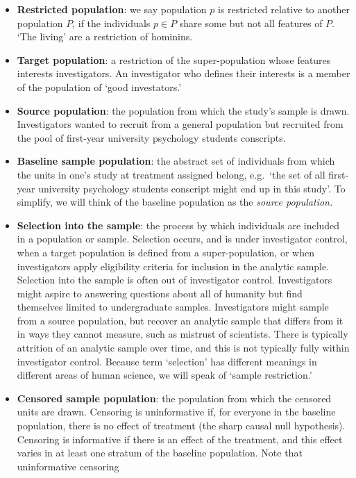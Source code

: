 \documentclass[
  single column]{article}
\begin{document}
\begin{itemize}
\item
  \textbf{Restricted population}: we say population \(p\) is restricted
  relative to another population \(P\), if the individuals \(p\in P\)
  share some but not all features of \(P\). `The living' are a
  restriction of hominins.
\item
  \textbf{Target population}: a restriction of the super-population
  whose features interests investigators. An investigator who defines
  their interests is a member of the population of `good investators.'
\item
  \textbf{Source population}: the population from which the study's
  sample is drawn. Investigators wanted to recruit from a general
  population but recruited from the pool of first-year university
  psychology students conscripts.
\item
  \textbf{Baseline sample population}: the abstract set of individuals
  from which the units in one's study at treatment assigned belong,
  e.g.~`the set of all first-year university psychology students
  conscript might end up in this study'. To simplify, we will think of
  the baseline population as the \emph{source population.}
\item
  \textbf{Selection into the sample}: the process by which individuals
  are included in a population or sample. Selection occurs, and is under
  investigator control, when a target population is defined from a
  super-population, or when investigators apply eligibility criteria for
  inclusion in the analytic sample. Selection into the sample is often
  out of investigator control. Investigators might aspire to answering
  questions about all of humanity but find themselves limited to
  undergraduate samples. Investigators might sample from a source
  population, but recover an analytic sample that differs from it in
  ways they cannot measure, such as mistrust of scientists. There is
  typically attrition of an analytic sample over time, and this is not
  typically fully within investigator control. Because term `selection'
  has different meanings in different areas of human science, we will
  speak of `sample restriction.'
\item
  \textbf{Censored sample population}: the population from which the
  censored units are drawn. Censoring is uninformative if, for everyone
  in the baseline population, there is no effect of treatment (the sharp
  causal null hypothesis). Censoring is informative if there is an
  effect of the treatment, and this effect varies in at least one
  stratum of the baseline population. Note that uninformative censoring

\end{itemize}
\end{document}
